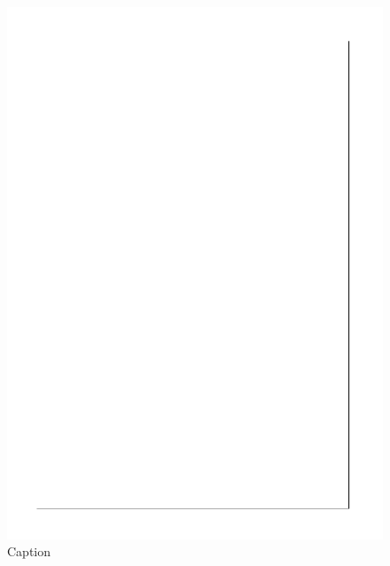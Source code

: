 

\begin{figure}[p]
    \centering
    \includegraphics{electrolysis/hazop.pdf}
    \caption{Caption}
    \label{fig:my_label}
\end{figure}


